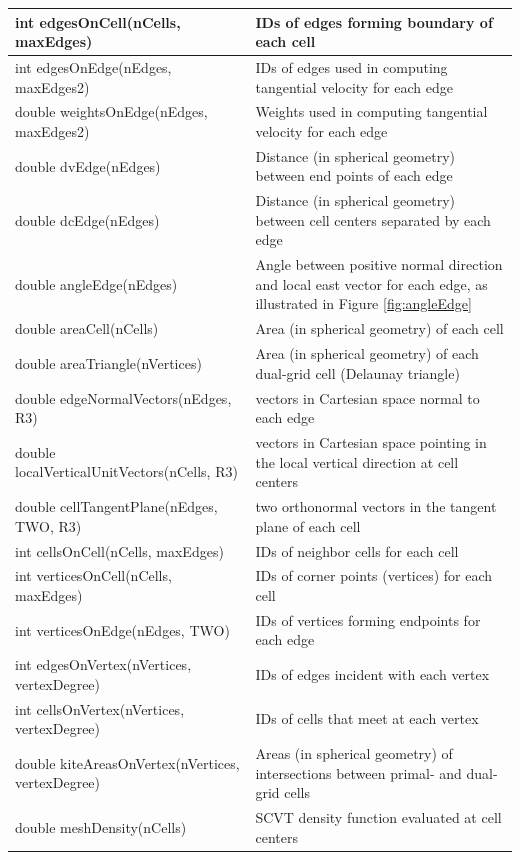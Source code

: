{\begin{longtable}{|p{2.75in} |p{3.5in}|}
        int edgesOnCell(nCells, maxEdges)   & IDs of edges forming boundary of each cell \\ \hline
        int edgesOnEdge(nEdges, maxEdges2)  & IDs of edges used in computing tangential velocity for each edge \\ \hline
        double \hfil\break weightsOnEdge(nEdges, maxEdges2)  & Weights used in computing tangential velocity for each edge \\ \hline
        double dvEdge(nEdges)            & Distance (in spherical geometry) between end points of each edge \\ \hline
        double dcEdge(nEdges)            & Distance (in spherical geometry) between cell centers separated by each edge \\ \hline
        double angleEdge(nEdges)         & Angle between positive normal direction and local east vector for each edge, as illustrated in Figure \ref{fig:angleEdge} \\ \hline
        double areaCell(nCells)          & Area (in spherical geometry) of each cell \\ \hline
        double areaTriangle(nVertices)   & Area (in spherical geometry) of each dual-grid cell (Delaunay triangle) \\ \hline
        double edgeNormalVectors(nEdges, R3)        & vectors in Cartesian space normal to each edge \\ \hline
        double \hfil\break localVerticalUnitVectors(nCells, R3) & vectors in Cartesian space pointing in the local vertical direction at cell centers \\ \hline
        double \hfil\break cellTangentPlane(nEdges, TWO, R3)    & two orthonormal vectors in the tangent plane of each cell \\ \hline
        int cellsOnCell(nCells, maxEdges)           & IDs of neighbor cells for each cell \\ \hline
        int verticesOnCell(nCells, maxEdges)        & IDs of corner points (vertices) for each cell \\ \hline
        int verticesOnEdge(nEdges, TWO)             & IDs of vertices forming endpoints for each edge \\ \hline
        int edgesOnVertex(nVertices, vertexDegree)  & IDs of edges incident with each vertex \\ \hline
        int cellsOnVertex(nVertices, vertexDegree)  & IDs of cells that meet at each vertex \\ \hline
        double kiteAreasOnVertex(nVertices, vertexDegree)   & Areas (in spherical geometry) of intersections between primal- and dual-grid cells \\ \hline 
        double meshDensity(nCells)   &  SCVT density function evaluated at cell centers \\ \hline
\end{longtable}
}

